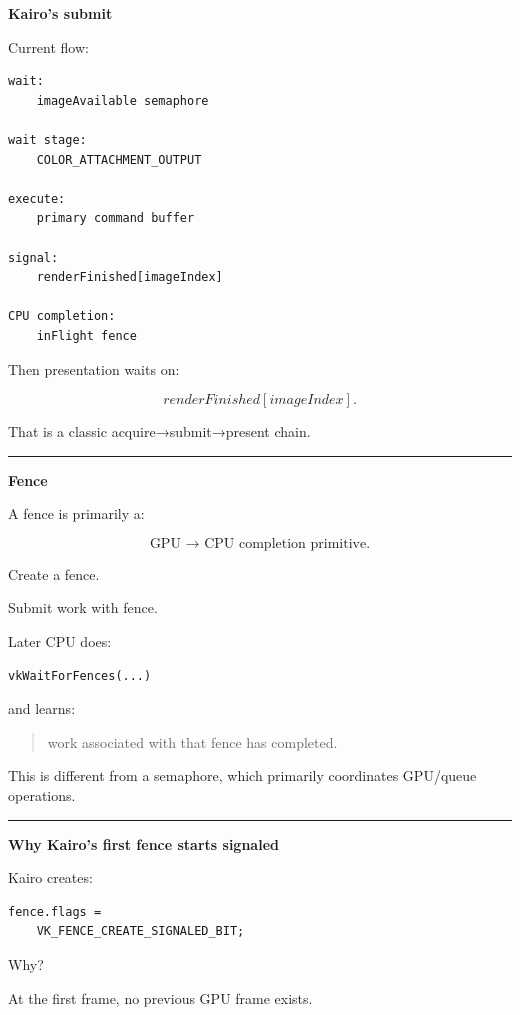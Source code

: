 \textbf{Kairo's submit}

Current flow:

\begin{verbatim}
wait:
    imageAvailable semaphore

wait stage:
    COLOR_ATTACHMENT_OUTPUT

execute:
    primary command buffer

signal:
    renderFinished[imageIndex]

CPU completion:
    inFlight fence
\end{verbatim}

Then presentation waits on:

\[
renderFinished[imageIndex].
\]

That is a classic acquire→submit→present chain.

\begin{center}\rule{0.5\linewidth}{0.5pt}\end{center}

\textbf{Fence}

A fence is primarily a:

\[
\boxed{\text{GPU → CPU completion primitive}.}
\]

Create a fence.

Submit work with fence.

Later CPU does:

\begin{verbatim}
vkWaitForFences(...)
\end{verbatim}

and learns:

\begin{quote}
work associated with that fence has completed.
\end{quote}

This is different from a semaphore, which primarily coordinates GPU/queue operations.

\begin{center}\rule{0.5\linewidth}{0.5pt}\end{center}

\textbf{Why Kairo's first fence starts signaled}

Kairo creates:

\begin{verbatim}
fence.flags =
    VK_FENCE_CREATE_SIGNALED_BIT;
\end{verbatim}

Why?

At the first frame, no previous GPU frame exists.

